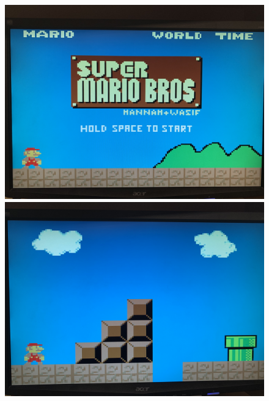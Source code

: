 \documentclass[12pt]{article}
\begin{document}
\begin{figure}
  \centering
  \begin{minipage}[b]{0.5\textwidth}
    \includegraphics[width=\textwidth]{IMG_1886.jpg}
  \end{minipage}
  \begin{minipage}[b]{0.5\textwidth}
    \includegraphics[width=\textwidth]{IMG_1887.jpg}
  \end{minipage}
\end{figure}
\end{document}
